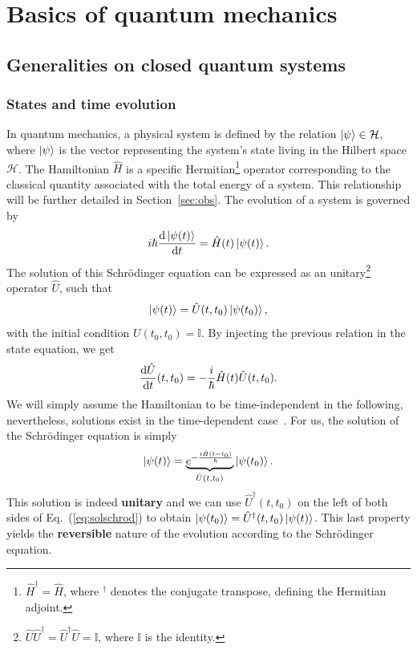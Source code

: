 \chapter{Basics of quantum mechanics}\setlength{\parindent}{6mm}\setlength{\parskip}{2mm}
\section{Generalities on closed quantum systems}
\subsection{States and time evolution}\label{Ii1}
In quantum mechanics, a physical system is defined by the relation $\ket{\psi}\in\mathcal{H}$, where $\ket{\psi}$ is the vector representing the system's state living in the Hilbert space $\mathcal{H}$. The Hamiltonian $\hat{H}$ is a specific Hermitian\footnote{$\hat{H}^\dagger=\hat{H}$, where $^\dagger$ denotes the conjugate transpose, defining the Hermitian adjoint. } operator corresponding to the classical quantity associated with the total energy of a system. This relationship will be further detailed in Section~\ref{sec:obs}. The evolution of a system is governed by
\begin{equation}
    i\hbar\frac{\mathrm{d}\ket{\psi(t)}}{\mathrm{d}t}=\hat{H}(t)\ket{\psi(t)}.
\end{equation}
The solution of this Schrödinger equation can be expressed as an unitary\footnote{$\hat{U}\hat{U}^\dagger=\hat{U}^\dagger \hat{U}=\mathbb{I}$, where $\mathbb{I}$ is the identity.} operator $\hat{U}$, such that
\begin{equation}
    \ket{\psi(t)}=\hat{U}(t,t_0)\ket{\psi(t_0)},
\end{equation}
with the initial condition $U(t_0,t_0)=\mathbb{I}$. By injecting the previous relation in the state equation, we get
\begin{equation}\label{eq:schrodU}
    \frac{\mathrm{d}\hat{U}}{\mathrm{d}t}(t,t_0)=-\frac{i}{\hbar}\hat{H}(t)\hat{U}(t,t_0).
\end{equation}
We will simply assume the Hamiltonian to be time-independent in the following, nevertheless, solutions exist in the time-dependent case~\cite{Breuer}. For us, the solution of the Schrödinger equation is simply
\begin{equation}\label{eq:solschrod}
    \ket{\psi(t)} = \underbrace{e^{-\frac{i\hat{H}(t-t_0)}{\hbar}}}_{\hat{U}(t,t_0)}\ket{\psi(t_0)}.
\end{equation} 
This solution is indeed \textbf{unitary} and we can use $\hat{U}^\dagger(t,t_0)$ on the left of both sides of Eq.~(\ref{eq:solschrod}) to obtain $\ket{\psi(t_0)}=\hat{U}^\dagger(t,t_0)\ket{\psi(t)}$. This last property yields the \textbf{reversible} nature of the evolution according to the Schrödinger equation.

